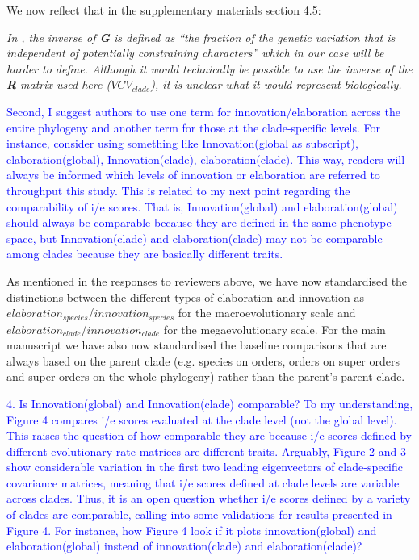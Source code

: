 \documentclass[12pt,letterpaper]{article}
\begin{document}
{We now reflect that in the supplementary materials section 4.5:

\noindent\textit{In \cite{hansen2008measuring}, the inverse of \textbf{G} is defined as ``the fraction of the genetic variation that is independent of potentially constraining characters'' which in our case will be harder to define.
Although it would technically be possible to use the inverse of the \textbf{R} matrix used here ($VCV_{clade}$), it is unclear what it would represent biologically.}


\textcolor{blue}{Second, I suggest authors to use one term for innovation/elaboration across the entire phylogeny and another term for those at the clade-specific levels. For instance, consider using something like Innovation(global as subscript), elaboration(global), Innovation(clade), elaboration(clade). This way, readers will always be informed which levels of innovation or elaboration are referred to throughput this study. This is related to my next point regarding the comparability of i/e scores. That is, Innovation(global) and elaboration(global) should always be comparable because they are defined in the same phenotype space, but Innovation(clade) and elaboration(clade) may not be comparable among clades because they are basically different traits.}

As mentioned in the responses to reviewers above, we have now standardised the distinctions between the different types of elaboration and innovation as $elaboration_{species}$/$innovation_{species}$ for the macroevolutionary scale and $elaboration_{clade}$/$innovation_{clade}$ for the megaevolutionary scale. For the main manuscript we have also now standardised the baseline comparisons that are always based on the parent clade (e.g. species on orders, orders on super orders and super orders on the whole phylogeny) rather than the parent’s parent clade.

\textcolor{blue}{4. Is Innovation(global) and Innovation(clade) comparable?
To my understanding, Figure 4 compares i/e scores evaluated at the clade level (not the global level). This raises the question of how comparable they are because i/e scores defined by different evolutionary rate matrices are different traits. Arguably, Figure 2 and 3 show considerable variation in the first two leading eigenvectors of clade-specific covariance matrices, meaning that i/e scores defined at clade levels are variable across clades. Thus, it is an open question whether i/e scores defined by a variety of clades are comparable, calling into some validations for results presented in Figure 4. For instance, how Figure 4 look if it plots innovation(global) and elaboration(global) instead of innovation(clade) and elaboration(clade)?}

}
\end{document}
